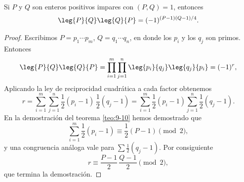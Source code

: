 \documentclass[12pt,a4paper]{book}
\begin{document}
    \begin{teorema}\label{teo:9-11}
        Si $P$ y $Q$ son enteros positivos impares con $(P,Q)=1$, entonces
        \begin{equation*}
            \leg{P}{Q}\leg{Q}{P}=(-1)^{(P-1)(Q-1)/4}.
        \end{equation*}
    \end{teorema}

    \begin{proof}
        Escribimos $P=p_{1}\cdots p_{m}$, $Q=q_{1}\cdots q_{n}$, en donde los $p_{i}$ y los $q_{j}$ son
        primos. Entonces
        \begin{equation*}
            \leg{P}{Q}\leg{Q}{P}=\prod_{i=1}^{m}\prod_{j=1}^{n}\leg{p_{i}}{q_{j}}\leg{q_{j}}{p_{i}}=(-1)^{r},
        \end{equation*}
        Aplicando la ley de reciprocidad cuadrática a cada factor obtenemos
        \begin{equation*}
            r=\sum_{i=1}^{m}\sum_{j=1}^{n}\frac{1}{2}(p_{i}-1)\,\frac{1}{2}(q_{j}-1)
            =\sum_{i=1}^{m}\frac{1}{2}(p_{i}-1)\sum_{j=1}^{n}\frac{1}{2}(q_{j}-1).
        \end{equation*}
        En la demostración del teorema \ref{teo:9-10} hemos demostrado que
        \begin{equation*}
            \sum_{i=1}^{m}\frac{1}{2}(p_{i}-1)\equiv\frac{1}{2}(P-1)\pmod{2},
        \end{equation*}
        y una congruencia análoga vale para $\sum\frac{1}{2}(q_{j}-1)$. Por consiguiente
        \begin{equation*}
            r\equiv\frac{P-1}{2}\,\frac{Q-1}{2}\pmod{2},
        \end{equation*}
        que termina la demostración.
    \end{proof}
\end{document}
